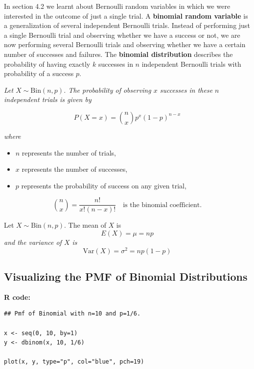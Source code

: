 In section 4.2 we learnt about Bernoulli random variables in which we were interested in the outcome of just a single trial. A \textbf{binomial random variable} is a generalization of several independent Bernoulli trials. Instead of performing just a single Bernoulli trial and observing whether we have a success or not, we are now performing several Bernoulli trials and observing whether we have a certain number of successes and failures. The \textbf{binomial distribution} describes the probability of having exactly \( k \) successes in \( n \) independent Bernoulli trials with probability of a success \( p \). \\
\begin{tcolorbox}[
  colback=yellow!10,
  colframe=yellow!10,
  boxrule=0pt,
  sharp corners=south,
  enhanced,
  breakable]

\textit{Let \( X \sim \text{Bin}(n, p) \). The probability of observing \( x \) successes in these \( n \) independent trials is given by}

\[
P(X = x) = \binom{n}{x} p^x (1 - p)^{n - x}
\]

\textit{where}
\begin{itemize}
  \item \( n \) represents the number of trials,
  \item \( x \) represents the number of successes,
  \item \( p \) represents the probability of success on any given trial,
\end{itemize}

\[
\binom{n}{x} = \frac{n!}{x!(n - x)!} \quad \text{is the binomial coefficient.}
\]

\end{tcolorbox}

\begin{definition}
Let \( X \sim \text{Bin}(n, p) \). The mean of \( X \) is
\[
E(X) = \mu = np
\]
\textit{and the variance of \( X \) is}
\[
\text{Var}(X) = \sigma^2 = np(1 - p)
\]
\end{definition}



\subsection{Visualizing the PMF of Binomial Distributions}

\noindent\textbf{R code:}
\begin{tcolorbox}[colback=gray!10, colframe=black!45, arc=2mm]
\begin{verbatim}
## Pmf of Binomial with n=10 and p=1/6.

x <- seq(0, 10, by=1)
y <- dbinom(x, 10, 1/6)

plot(x, y, type="p", col="blue", pch=19)
\end{verbatim}
\end{tcolorbox}


